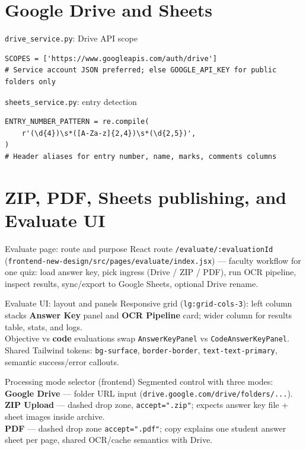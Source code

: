 \documentclass[aspectratio=169]{beamer}
\begin{document}
\section{Google Drive and Sheets}

\begin{frame}[fragile]{\texttt{drive\_service.py}: Drive API scope}
\begin{lstlisting}[style=py]
SCOPES = ['https://www.googleapis.com/auth/drive']
# Service account JSON preferred; else GOOGLE_API_KEY for public folders only
\end{lstlisting}
\end{frame}

\begin{frame}[fragile]{\texttt{sheets\_service.py}: entry detection}
\begin{lstlisting}[style=py]
ENTRY_NUMBER_PATTERN = re.compile(
    r'(\d{4})\s*([A-Za-z]{2,4})\s*(\d{2,5})',
)
# Header aliases for entry number, name, marks, comments columns
\end{lstlisting}
\end{frame}


\section{ZIP, PDF, Sheets publishing, and Evaluate UI}

\begin{frame}{Evaluate page: route and purpose}
  \small
  React route \texttt{/evaluate/:evaluationId} (\texttt{frontend-new-design/src/pages/evaluate/index.jsx}) --- faculty workflow for one quiz: load answer key, pick ingress (Drive / ZIP / PDF), run OCR pipeline, inspect results, sync/export to Google Sheets, optional Drive rename.
\end{frame}

\begin{frame}{Evaluate UI: layout and panels}
  \small
  Responsive grid (\texttt{lg:grid-cols-3}): left column stacks \textbf{Answer Key} panel and \textbf{OCR Pipeline} card; wider column for results table, stats, and logs.\\
  Objective vs \textbf{code} evaluations swap \texttt{AnswerKeyPanel} vs \texttt{CodeAnswerKeyPanel}.\\
  Shared Tailwind tokens: \texttt{bg-surface}, \texttt{border-border}, \texttt{text-text-primary}, semantic success/error callouts.
\end{frame}

\begin{frame}{Processing mode selector (frontend)}
  \small
  Segmented control with three modes:\\
  \textbf{Google Drive} --- folder URL input (\texttt{drive.google.com/drive/folders/...}).\\
  \textbf{ZIP Upload} --- dashed drop zone, \texttt{accept=".zip"}; expects answer key file + sheet images inside archive.\\
  \textbf{PDF} --- dashed drop zone \texttt{accept=".pdf"}; copy explains one student answer sheet per page, shared OCR/cache semantics with Drive.
\end{frame}
\end{document}
